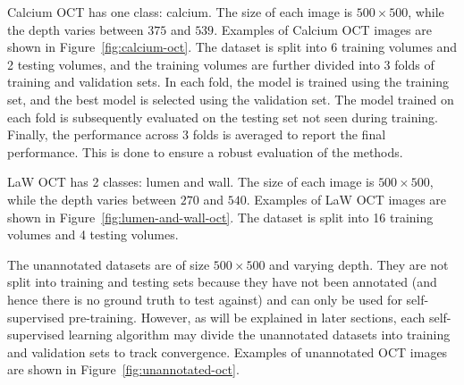 \documentclass[a4paper,11pt,oneside]{report}
\begin{document}
Calcium OCT has one class: calcium. The size of each image is $500\times 500$, while the depth varies between $375$ and $539$. Examples of Calcium OCT images are shown in Figure~\ref{fig:calcium-oct}. The dataset is split into 6 training volumes and 2 testing volumes, and the training volumes are further divided into 3 folds of training and validation sets. In each fold, the model is trained using the training set, and the best model is selected using the validation set. The model trained on each fold is subsequently evaluated on the testing set not seen during training. Finally, the performance across 3 folds is averaged to report the final performance. This is done to ensure a robust evaluation of the methods.

LaW OCT has 2 classes: lumen and wall. The size of each image is $500\times 500$, while the depth varies between $270$ and $540$. Examples of LaW OCT images are shown in Figure~\ref{fig:lumen-and-wall-oct}. The dataset is split into 16 training volumes and 4 testing volumes. 

The unannotated datasets are of size $500\times 500$ and varying depth. They are not split into training and testing sets because they have not been annotated (and hence there is no ground truth to test against) and can only be used for self-supervised pre-training. However, as will be explained in later sections, each self-supervised learning algorithm may divide the unannotated datasets into training and validation sets to track convergence. Examples of unannotated OCT images are shown in Figure~\ref{fig:unannotated-oct}.
\end{document}
